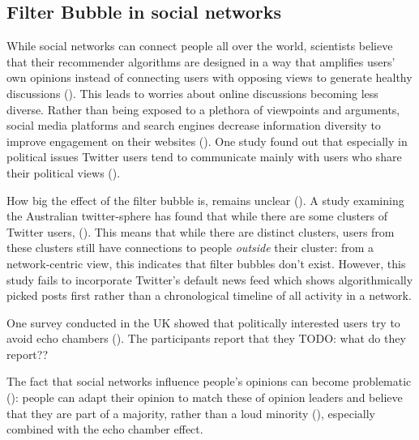 \subsection{Filter Bubble in social networks}
While social networks can connect people all over the world, scientists believe that their recommender algorithms are designed in a way that amplifies users' own opinions instead of connecting users with opposing views to generate healthy discussions (\cite{pariser2011filter}). This leads to worries about online discussions becoming less diverse. Rather than being exposed to a plethora of viewpoints and arguments, social media platforms and search engines decrease information diversity to improve engagement on their websites (\cite{bozdagBreakingFilterBubble2015}). One study found out that especially in political issues Twitter users tend to communicate mainly with users who share their political views (\cite{barberaTweetingLeftRight2015}).


How big the effect of the filter bubble is, remains unclear (\cite{brunsEchoChamberWhat2017}). A study examining the Australian twitter-sphere has found that while there are some clusters of Twitter users,  (\cite[9]{brunsEchoChamberWhat2017}). This means that while there are distinct clusters, users from these clusters still have connections to people \emph{outside} their cluster: from a network-centric view, this indicates that filter bubbles don't exist. However, this study fails to incorporate Twitter's default news feed which shows algorithmically picked posts first rather than a chronological timeline of all activity in a network.

One survey conducted in the UK showed that politically interested users try to avoid echo chambers (\cite{duboisEchoChamberOverstated2018}). The participants report that they TODO: what do they report??


The fact that social networks influence people's opinions can become problematic (\cite{altafiniDynamicsOpinionForming2012}): people can adapt their opinion to match these of opinion leaders and believe that they are part of a majority, rather than a loud minority (\cite{moscoviciSilentMajoritiesLoud1991}), especially combined with the echo chamber effect. %



